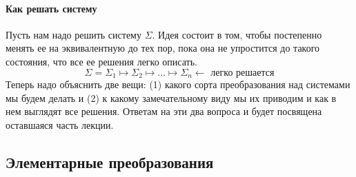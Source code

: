 \paragraph{Как решать систему}

Пусть нам надо решить систему $\Sigma$.
Идея состоит в том, чтобы постепенно менять ее на эквивалентную до тех пор, пока она не упростится до такого состояния, что все ее решения легко описать.
\[
\Sigma = \Sigma_1 \mapsto \Sigma_2 \mapsto \ldots \mapsto \Sigma_n \leftarrow\text{ легко решается}
\]
Теперь надо объяснить две вещи: (1) какого сорта преобразования над системами мы будем делать и (2) к какому замечательному виду мы их приводим и как в нем выглядят все решения.
Ответам на эти два вопроса и будет посвящена оставшаяся часть лекции.

\subsection{Элементарные преобразования} 

